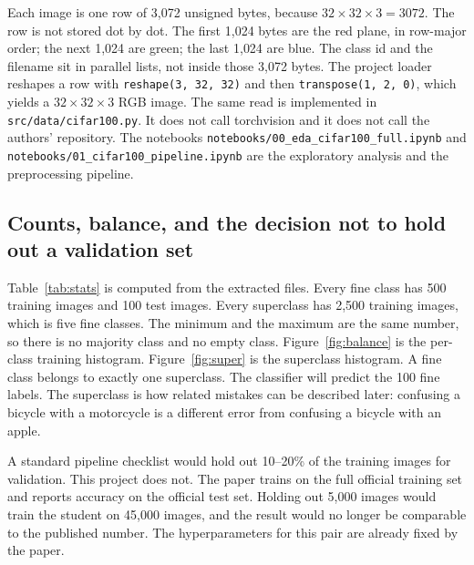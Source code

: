 \documentclass[11pt]{article}
\begin{document}
Each image is one row of 3{,}072 unsigned bytes, because \(32 \times 32 \times 3 = 3072\). The row is not stored dot by dot. The first 1{,}024 bytes are the red plane, in row-major order; the next 1{,}024 are green; the last 1{,}024 are blue. The class id and the filename sit in parallel lists, not inside those 3{,}072 bytes. The project loader reshapes a row with \texttt{reshape(3, 32, 32)} and then \texttt{transpose(1, 2, 0)}, which yields a \(32 \times 32 \times 3\) RGB image. The same read is implemented in \texttt{src/data/cifar100.py}. It does not call torchvision and it does not call the authors' repository. The notebooks \texttt{notebooks/00\_eda\_cifar100\_full.ipynb} and \texttt{notebooks/01\_cifar100\_pipeline.ipynb} are the exploratory analysis and the preprocessing pipeline.

\subsection{Counts, balance, and the decision not to hold out a validation set}

Table~\ref{tab:stats} is computed from the extracted files. Every fine class has 500 training images and 100 test images. Every superclass has 2{,}500 training images, which is five fine classes. The minimum and the maximum are the same number, so there is no majority class and no empty class. Figure~\ref{fig:balance} is the per-class training histogram. Figure~\ref{fig:super} is the superclass histogram. A fine class belongs to exactly one superclass. The classifier will predict the 100 fine labels. The superclass is how related mistakes can be described later: confusing a bicycle with a motorcycle is a different error from confusing a bicycle with an apple.

A standard pipeline checklist would hold out 10--20\% of the training images for validation. This project does not. The paper trains on the full official training set and reports accuracy on the official test set. Holding out 5{,}000 images would train the student on 45{,}000 images, and the result would no longer be comparable to the published number. The hyperparameters for this pair are already fixed by the paper.
\end{document}

